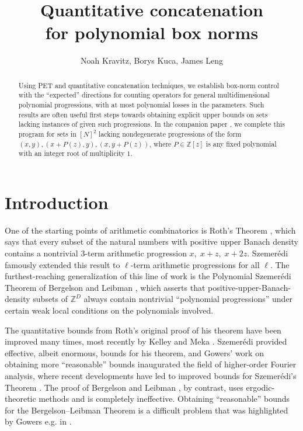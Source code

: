 \documentclass[11pt]{amsart}
\title[]{Quantitative concatenation\\ for polynomial box norms}
\author{Noah Kravitz, Borys Kuca, James Leng}
\date{}
\theoremstyle{definition}
\newcommand{\Z}{{\mathbb Z}}
\begin{document}
\begin{abstract}
Using PET and quantitative concatenation techniques, we establish box-norm control with the ``expected'' directions for counting operators for general multidimensional polynomial progressions, with at most polynomial losses in the parameters.  Such results are often useful first steps towards obtaining explicit upper bounds on sets lacking instances of given such progressions.  In the companion paper \cite{KKL24b}, we complete this program for sets in $[N]^2$ lacking nondegenerate progressions of the form $(x, y), (x + P(z), y), (x, y + P(z))$, where $P \in \mathbb{Z}[z]$ is any fixed polynomial with an integer root of multiplicity $1$.
\end{abstract}

\maketitle

\tableofcontents


\section{Introduction}



One of the starting points of arithmetic combinatorics is Roth's Theorem \cite{R53}, which says that every subset of the natural numbers with positive upper Banach density contains a nontrivial $3$-term arithmetic progression $x,\; x+z,\; x+2z$.  Szemer\'edi \cite{Sz75} famously extended this result to $\ell$-term arithmetic progressions for all $\ell$.  The furthest-reaching generalization of this line of work is the Polynomial Szemer\'edi Theorem of Bergelson and Leibman \cite{BL96}, which asserts that positive-upper-Banach-density subsets of $\Z^D$ always contain nontrivial ``polynomial progressions'' under certain weak local conditions on the polynomials involved.

The quantitative bounds from Roth's original proof of his theorem have been improved many times, most recently by Kelley and Meka \cite{KM23}.  Szemer\'edi provided effective, albeit enormous, bounds for his theorem, and Gowers' work \cite{Go01} on obtaining more ``reasonable'' bounds inaugurated the field of higher-order Fourier analysis, where recent developments have led to improved bounds for Szemer\'edi's Theorem \cite{LSS24b}.  The proof of Bergelson and Leibman \cite{BL96}, by contrast, uses ergodic-theoretic methods and is completely ineffective.  Obtaining ``reasonable'' bounds for the Bergelson--Leibman Theorem is a difficult problem that was highlighted by Gowers e.g. in \cite{Go98b}.
\end{document}
